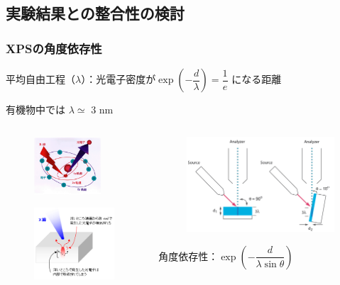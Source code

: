 \documentclass[unicode,12pt]{beamer}%
\begin{document}
\subsection{実験結果との整合性の検討}
\begin{frame}\frametitle{XPSの角度依存性}

{\small %

平均自由工程（$\lambda$）：光電子密度が$\exp \left(-\dfrac{d}{\lambda}\right) = \dfrac{1}{e}$ になる距離

有機物中では $\lambda \simeq$ 3 nm}
\begin{columns}
\begin{column}{4cm}
	\vspace{-10pt}
	\begin{figure}[htbp]
		\begin{center}
			\includegraphics[width=25mm]{XPS_Genri_1.png}
		\end{center}
	\end{figure}
	\vspace{-20pt}
	\begin{figure}[htbp]
		\begin{center}
			\includegraphics[width=30mm]{XPS_Genri_3.png}
		\end{center}
	\end{figure}
\end{column}
\begin{column}{7cm}
	\begin{figure}[htbp]
		\begin{center}
			\includegraphics[width=55mm]{XPS_KAKUDO.png}
		\end{center}
\end{figure}

\vspace{-5pt}
{\small 角度依存性：$\exp \left(-\dfrac{d}{\lambda \sin \theta}\right)$}

\end{column}
\end{columns}

\end{frame}
\end{document}
